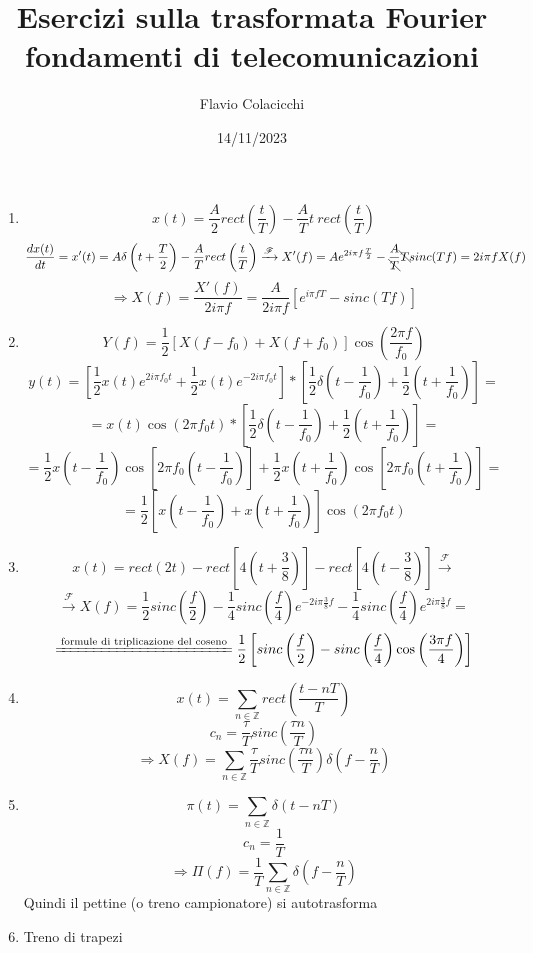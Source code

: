 \documentclass{article}
\title{Esercizi sulla trasformata Fourier\\\normalsize fondamenti di telecomunicazioni}
\author{Flavio Colacicchi}
\date{14/11/2023}
\newcommand{\trasformata}{\xrightarrow{\mathscr{F}}}
\begin{document}
\maketitle
\begin{enumerate}
    \item \[x(t)=\frac{A}{2}rect\left(\frac{t}{T}\right)-\frac{A}{T}t\ rect\left(\frac{t}{T}\right)\]
        \[\frac{dx(t)}{dt}=x'(t)=A\delta\left(t+\frac{T}{2}\right)-\frac{A}{T}rect\left(\frac{t}{T}\right)\trasformata X'(f)=Ae^{2i\pi f\frac{T}{2}}-\frac{A}{\bcancel{T}}\bcancel{T}sinc(Tf)=2i\pi fX(f)\]
        \[\Rightarrow X(f)=\frac{X'(f)}{2i\pi f}=\frac{A}{2i\pi f}\left[e^{i\pi fT}-sinc(Tf)\right]\]
    \item \[Y(f)=\frac{1}{2}\left[X(f-f_0)+X(f+f_0)\right]\cos\left(\frac{2\pi f}{f_0}\right)\]
        \[y(t)=\left[\frac{1}{2}x(t)e^{2i\pi f_0 t}+\frac{1}{2}x(t)e^{-2i\pi f_0 t}\right]*\left[\frac{1}{2}\delta\left(t-\frac{1}{f_0}\right)+\frac{1}{2}\left(t+\frac{1}{f_0}\right)\right]=\]
        \[=x(t)\cos(2\pi f_0 t)*\left[\frac{1}{2}\delta\left(t-\frac{1}{f_0}\right)+\frac{1}{2}\left(t+\frac{1}{f_0}\right)\right]=\]
        \[=\frac{1}{2}x\left(t-\frac{1}{f_0}\right)\cos\left[2\pi f_0\left(t-\frac{1}{f_0}\right)\right]+\frac{1}{2}x\left(t+\frac{1}{f_0}\right)\cos\left[2\pi f_0\left(t+\frac{1}{f_0}\right)\right]=\]
        \[=\frac{1}{2}\left[x\left(t-\frac{1}{f_0}\right)+x\left(t+\frac{1}{f_0}\right)\right]\cos(2\pi f_0 t)\]
    \item \[x(t)=rect(2t)-rect\left[4\left(t+\frac{3}{8}\right)\right]-rect\left[4\left(t-\frac{3}{8}\right)\right]\trasformata\]
        \[\trasformata X(f)=\frac{1}{2}sinc\left(\frac{f}{2}\right)-\frac{1}{4}sinc\left(\frac{f}{4}\right)e^{-2i\pi\frac{3}{8}f}-\frac{1}{4}sinc\left(\frac{f}{4}\right)e^{2i\pi\frac{3}{8}f}=\]
        \[\xlongequal{\text{formule di triplicazione del coseno}}\frac{1}{2}\left[sinc\left(\frac{f}{2}\right)-sinc\left(\frac{f}{4}\right)\cos\left(\frac{3\pi f}{4}\right)\right]\]
    \item \[x(t)=\sum_{n\in\mathbb{Z}}rect\left(\frac{t-nT}{T}\right)\]
        \[c_n=\frac{\tau}{T}sinc\left(\frac{\tau n}{T}\right)\]
        \[\Rightarrow X(f)=\sum_{n\in\mathbb{Z}}\frac{\tau}{T}sinc\left(\frac{\tau n}{T}\right)\delta\left(f-\frac{n}{T}\right)\]
    \item \[\pi(t)=\sum_{n\in\mathbb{Z}}\delta(t-nT)\]
        \[c_n=\frac{1}{T}\]
        \[\Rightarrow \Pi(f)=\frac{1}{T}\sum_{n\in\mathbb{Z}}\delta\left(f-\frac{n}{T}\right)\]
        Quindi il pettine (o treno campionatore) si autotrasforma
    \item Treno di trapezi

\end{enumerate}
\end{document}
